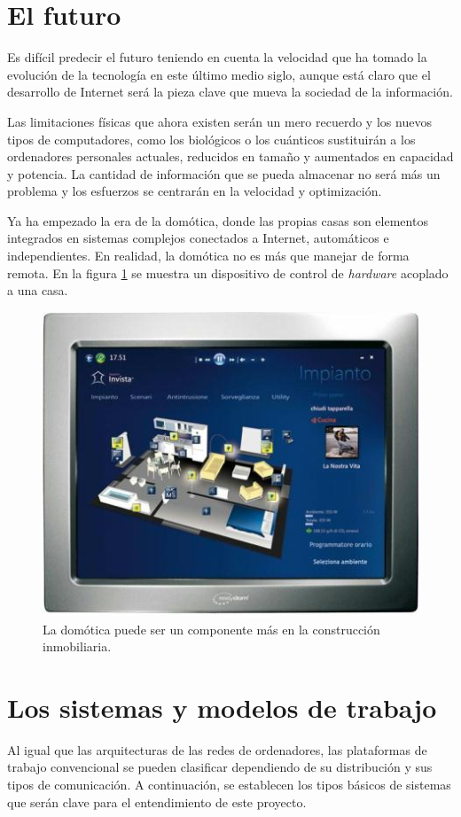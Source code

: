 \section{El futuro}

Es difícil predecir el futuro teniendo en cuenta la velocidad que ha 
tomado la evolución de la tecnología en este último medio siglo, 
aunque está claro que el desarrollo de Internet será la pieza clave 
que mueva la sociedad de la información.

Las limitaciones físicas que ahora existen serán un mero recuerdo y 
los nuevos tipos de computadores, como los biológicos o los cuánticos 
sustituirán a los ordenadores personales actuales, reducidos en 
tamaño y aumentados en capacidad y potencia. La cantidad de 
información que se pueda almacenar no será más un problema y los 
esfuerzos se centrarán en la velocidad y optimización.

Ya ha empezado la era de la domótica, donde las propias casas son 
elementos integrados en sistemas complejos conectados a Internet, 
automáticos e independientes. En realidad, la domótica no es más que 
manejar \hardware de forma remota. En la figura \ref{fig:domotica} se 
muestra un dispositivo de control de \emph{hardware} acoplado a una 
casa.

\begin{figure}[h]
	\centering
	\includegraphics[scale=0.6]{images/domotica.png}
	\caption[Componente domótico]{La domótica puede ser un componente más en la 
	construcción inmobiliaria.}
	\label{fig:domotica}
\end{figure}


\section{Los sistemas y modelos de trabajo}
Al igual que las arquitecturas de las redes de ordenadores, las 
plataformas de trabajo convencional se pueden clasificar dependiendo 
de su distribución y sus tipos de comunicación. A continuación, se 
establecen los tipos básicos de sistemas que serán clave para el 
entendimiento de este proyecto.


